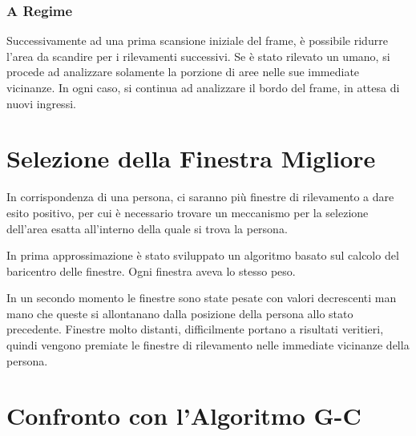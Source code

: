 
            \subsubsection{A Regime} %
            \label{ssub:a_regime}
                Successivamente ad una prima scansione iniziale del frame, è possibile ridurre l'area da scandire per i rilevamenti successivi.
                Se è stato rilevato un umano, si procede ad analizzare solamente la porzione di aree nelle sue immediate vicinanze.
                In ogni caso, si continua ad analizzare il bordo del frame, in attesa di nuovi ingressi.
            


    \section{Selezione della Finestra Migliore} %
    \label{sec:best_detection_window}
            In corrispondenza di una persona, ci saranno più finestre di rilevamento a dare esito positivo, per cui è necessario trovare un meccanismo per la selezione dell'area esatta all'interno della quale si trova la persona.
        
            In prima approssimazione è stato sviluppato un algoritmo basato sul calcolo del baricentro delle finestre.
            Ogni finestra aveva lo stesso peso.

            In un secondo momento le finestre sono state pesate con valori decrescenti man mano che queste si allontanano dalla posizione della persona allo stato precedente.
            Finestre molto distanti, difficilmente portano a risultati veritieri, quindi vengono premiate le finestre di rilevamento nelle immediate vicinanze della persona.

    \section{Confronto con l'Algoritmo G-C} %
    \label{sec:gc_algorithm_comparison}